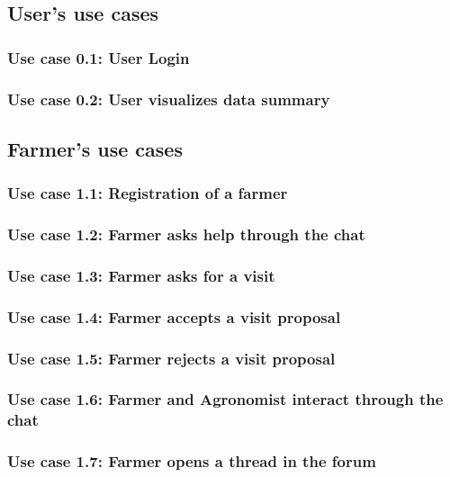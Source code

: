 \documentclass[10pt]{report}
\begin{document}
\subsection{User's use cases}
\subsubsection{Use case 0.1: User Login}

\subsubsection{Use case 0.2: User visualizes data summary}

\subsection{Farmer's use cases}
\subsubsection{Use case 1.1: Registration of a farmer}

\subsubsection{Use case 1.2: Farmer asks help through the chat}

\subsubsection{Use case 1.3: Farmer asks for a visit}

\subsubsection{Use case 1.4: Farmer accepts a visit proposal}

\subsubsection{Use case 1.5: Farmer rejects a visit proposal}

\subsubsection{Use case 1.6: Farmer and Agronomist interact through the chat}

\subsubsection{Use case 1.7: Farmer opens a thread in the forum}

\end{document}
